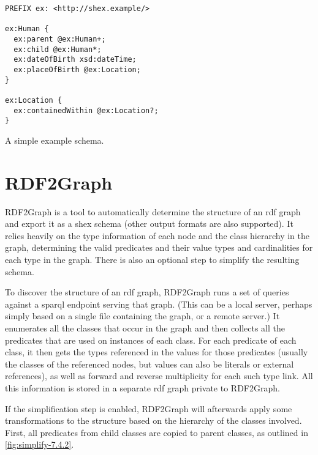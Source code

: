 \begin{lstfloat}
\begin{lstlisting}[language=sparql]
PREFIX ex: <http://shex.example/>

ex:Human {
  ex:parent @ex:Human+;
  ex:child @ex:Human*;
  ex:dateOfBirth xsd:dateTime;
  ex:placeOfBirth @ex:Location;
}

ex:Location {
  ex:containedWithin @ex:Location?;
}
\end{lstlisting}
\caption{A simple example schema.}
\label{listing:shex-example}
\end{lstfloat}


\section{RDF2Graph}
\label{ch:Background:RDF2Graph}


RDF2Graph %
\cite{vanDam2015}
is a tool to automatically determine the structure of an \gls{rdf} graph
and export it as a \gls{shex} schema
(other output formats are also supported).
It relies heavily on the type information of each node and the class hierarchy in the graph,
determining the valid predicates and their value types and cardinalities for each type in the graph.
There is also an optional step to simplify the resulting schema.

To discover the structure of an \gls{rdf} graph,
RDF2Graph runs a set of queries against a \gls{sparql} endpoint serving that graph.
(This can be a local server, perhaps simply based on a single file containing the graph,
or a remote server.)
It enumerates all the classes that occur in the graph
and then collects all the predicates that are used on instances of each class.
For each predicate of each class,
it then gets the types referenced in the values for those predicates
(usually the classes of the referenced nodes,
but values can also be literals or external references),
as well as forward and reverse multiplicity for each such type link.
All this information is stored in a separate \gls{rdf} graph private to RDF2Graph.

If the simplification step is enabled,
RDF2Graph will afterwards apply some transformations to the structure
based on the hierarchy of the classes involved.
First, all predicates from child classes are copied to parent classes,
as outlined in \cref{fig:simplify-7.4.2}.

